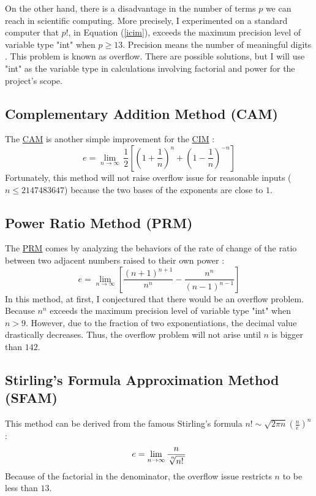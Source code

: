 \documentclass[11pt]{article}
\begin{document}
On the other hand, there is a disadvantage in the number of terms $p$ we can reach in scientific computing. More precisely, I experimented on a standard computer that $p!$, in Equation (\ref{icim}), exceeds the maximum precision level of variable type "int" when $p\geq 13$. Precision means the number of meaningful digits \cite{bk:savitch}. This problem is known as overflow. There are possible solutions, but I will use "int" as the variable type in calculations involving factorial and power for the project's scope.

\subsection{Complementary Addition Method (CAM)}\label{2.3}
The \hyperref[2.3]{CAM} is another simple improvement for the \hyperref[2.1]{CIM} \cite{ar:brothers_knox}:
\begin{equation}
e=\lim_{n\to\infty}\,\frac{1}{2}\left[\left(1+\frac{1}{n}\right)^{n}+\left(1-\frac{1}{n}\right)^{-n}\right]
\end{equation}
Fortunately, this method will not raise overflow issue for reasonable inputs ($n\leq2147483647$) because the two bases of the exponents are close to $1$.

\subsection{Power Ratio Method (PRM)}\label{2.4}
The \hyperref[2.4]{PRM} comes by analyzing the behaviors of the rate of change of the ratio between two adjacent numbers raised to their own power \cite{ar:brothers_knox}:
\begin{equation}
e=\lim_{n\to\infty} \left[\frac{(n+1)^{n+1}}{n^{n}}-\frac{n^{n}}{(n-1)^{n-1}}\right]
\end{equation}
In this method, at first, I conjectured that there would be an overflow problem. Because $n^n$ exceeds the maximum precision level of variable type "int" when $n>9$. However, due to the fraction of two exponentiations, the decimal value drastically decreases. Thus, the overflow problem will not arise until $n$ is bigger than $142$.

\subsection{Stirling's Formula Approximation Method (SFAM)}\label{2.5}
This method can be derived from the famous Stirling's formula $n!\sim\sqrt{2\pi n}\left(\frac{n}{e}\right)^{n}$:
\begin{equation}
e=\lim_{n\to\infty} \frac{n}{\sqrt[\leftroot{-2}\uproot{2}n]{n!\,}}
\end{equation}
Because of the factorial in the denominator, the overflow issue restricts $n$ to be less than $13$.
\end{document}
